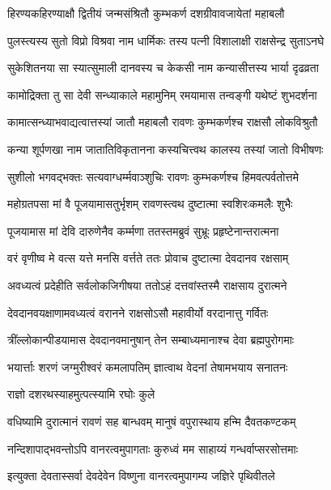\twolineshloka
{हिरण्यकहिरण्याक्षौ द्वितीयं जन्मसंश्रितौ}
{कुम्भकर्ण दशग्रीवावजायेतां महाबलौ}%

\twolineshloka
{पुलस्त्यस्य सुतो विप्रो विश्रवा नाम धार्मिकः}
{तस्य पत्नी विशालाक्षी राक्षसेन्द्र सुताऽनघे}%

\twolineshloka
{सुकेशितनया सा स्यात्सुमाली दानवस्य च}
{केकसी नाम कन्यासीत्तस्य भार्या दृढव्रता}%

\twolineshloka
{कामोद्रिक्ता तु सा देवी सन्ध्याकाले महामुनिम्}
{रमयामास तन्वङ्गी यथेष्टं शुभदर्शना}%

\twolineshloka
{कामात्सन्ध्याभवाद्यत्वात्तस्यां जातौ महाबलौ}
{रावणः कुम्भकर्णश्च राक्षसौ लोकविश्रुतौ}%

\twolineshloka
{कन्या शूर्पणखा नाम जातातिविकृतानना}
{कस्यचित्त्वथ कालस्य तस्यां जातो विभीषणः}%

\twolineshloka
{सुशीलो भगवद्भक्तः सत्यवाग्धर्म्मवाञ्शुचिः}
{रावणः कुम्भकर्णश्च हिमवत्पर्वतोत्तमे}%

\twolineshloka
{महोग्रतपसा मां वै पूजयामासतुर्भृशम्}
{रावणस्त्वथ दुष्टात्मा स्वशिरःकमलैः शुभैः}%

\twolineshloka
{पूजयामास मां देवि दारुणेनैव कर्म्मणा}
{ततस्तमब्रुवं सुभ्रूः प्रहृष्टेनान्तरात्मना}%

\twolineshloka
{वरं वृणीष्व मे वत्स यत्ते मनसि वर्त्तते}
{ततः प्रोवाच दुष्टात्मा देवदानव रक्षसाम्}%

\twolineshloka
{अवध्यत्वं प्रदेहीति सर्वलोकजिगीषया}
{ततोऽहं दत्तवांस्तस्मै राक्षसाय दुरात्मने}%

\twolineshloka
{देवदानवयक्षाणामवध्यत्वं वरानने}
{राक्षसोऽसौ महावीर्यो वरदानात्तु गर्वितः}%

\twolineshloka
{त्रींल्लोकान्पीडयामास देवदानवमानुषान्}
{तेन सम्बाध्यमानाश्च देवा ब्रह्मपुरोगमाः}%

\twolineshloka
{भयार्त्ताः शरणं जग्मुरीश्वरं कमलापतिम्}
{ज्ञात्वाथ वेदनां तेषामभयाय सनातनः}%


\onelineshloka
{राज्ञो दशरथस्याहमुत्पत्स्यामि रघोः कुले}%

\twolineshloka
{वधिष्यामि दुरात्मानं रावणं सह बान्धवम्}
{मानुषं वपुरास्थाय हन्मि दैवतकण्टकम्}%

\twolineshloka
{नन्दिशापाद्भवन्तोऽपि वानरत्वमुपागताः}
{कुरुध्वं मम साहाय्यं गन्धर्वाप्सरसोत्तमाः}%


\twolineshloka
{इत्युक्ता देवतास्सर्वा देवदेवेन विष्णुना}
{वानरत्वमुपागम्य जज्ञिरे पृथिवीतले}%

